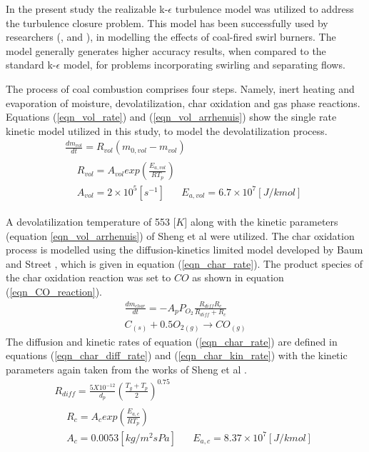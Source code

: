 \documentclass[review]{elsarticle}
\begin{document}
In the present study the realizable k-$\epsilon$ turbulence model was utilized to address the turbulence closure problem. This model has been successfully used by researchers (\cite{Belosevic2019a},\cite{Laubscher2019a} and \cite{Modlinski2019}), in modelling the effects of coal-fired swirl burners. The model generally generates higher accuracy results, when compared to the standard k-$\epsilon$ model, for problems incorporating swirling and separating flows.

The process of coal combustion comprises four steps. Namely, inert heating and evaporation of moisture, devolatilization, char oxidation and gas phase reactions. Equations (\ref{eqn_vol_rate}) and (\ref{eqn_vol_arrhenuis}) show the single rate kinetic model utilized in this study, to model the devolatilization process.
\begin{gather}
\frac{dm_{vol}}{dt} = R_{vol}(m_{0,vol}-m_{vol}) \label{eqn_vol_rate} \\
\begin{split}
&R_{vol} = A_{vol}exp\left(\frac{E_{a,vol}}{RT_p}\right)\\
&A_{vol} = 2\times10^5 [s^{-1}]\,\,\,\,\,\,\,\,\,\,E_{a,vol} = 6.7\times10^7 [J/kmol] \label{eqn_vol_arrhenuis}
\end{split}
\end{gather}

A devolatilization temperature of 553 [$K$] \citep{Ranade2015} along with the kinetic parameters (equation \ref{eqn_vol_arrhenuis}) of Sheng et al \cite{Sheng2004} were utilized. The char oxidation process is modelled using the diffusion-kinetics limited model developed by Baum and Street \cite{Baum1971}, which is given in equation (\ref{eqn_char_rate}). The product species of the char oxidation reaction was set to $CO$ as shown in equation (\ref{eqn_CO_reaction}). 
\begin{gather}
\frac{dm_{char}}{dt} = -A_p P_{O_{2}} \frac{R_{diff}R_c}{R_{diff} + R_c}  \label{eqn_char_rate}\\
C_{(s)}+0.5O_{2(g)}\to CO_{(g)} \label{eqn_CO_reaction}
\end{gather}
The diffusion and kinetic rates of equation (\ref{eqn_char_rate}) are defined in equations (\ref{eqn_char_diff_rate})  and (\ref{eqn_char_kin_rate}) with the kinetic parameters again taken from the works of Sheng et al \citep{Sheng2004}.
\begin{gather}
R_{diff} = \frac{5X10^{-12}}{d_p} \left(\frac{T_g+T_p}{2}\right)^0.75 \label{eqn_char_diff_rate}\\
\begin{split}
&R_{c} = A_{c}exp\left(\frac{E_{a,c}}{RT_p}\right)\\
&A_{c} = 0.0053 [kg/m^2sPa]\,\,\,\,\,\,\,\,\,\,E_{a,c} = 8.37\times10^7 [J/kmol]
\end{split}
 \label{eqn_char_kin_rate}
\end{gather}
\end{document}
